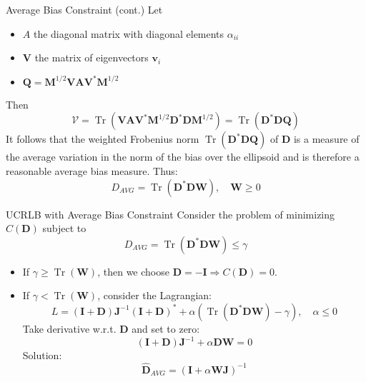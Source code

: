 \documentclass{beamer}
\begin{document}
\begin{frame}{Average Bias Constraint (cont.)}
Let
\begin{itemize}
    \item $A$ the diagonal matrix with diagonal elements $\alpha_{ii}$
    \item $\mathbf{V}$ the matrix of eigenvectors $\mathbf{v}_i$
    \item $\mathbf{Q} = \mathbf{M}^{1/2} \mathbf{V A V}^* \mathbf{M}^{1/2}$
\end{itemize}
Then 
\[
 \mathcal{V} = \operatorname{Tr}\left(\mathbf{V A V}^*\mathbf{M}^{1/2}\mathbf{D}^*\mathbf{DM}^{1/2}\right)
  = \operatorname{Tr}(\mathbf{D}^*\mathbf{D Q})
\]
It follows that the weighted Frobenius norm $\operatorname{Tr}(\mathbf{D}^*\mathbf{D Q})$ of $\mathbf{D}$ 
is a measure of the average variation in the norm of the bias over the ellipsoid and is therefore a reasonable
average bias measure. Thus:
\[
D_{AVG} = \operatorname{Tr}(\mathbf{D}^*\mathbf{D W}), \quad \mathbf{W} \geq 0
\]
\end{frame}

\begin{frame}{UCRLB with Average Bias Constraint}
    Consider the problem of minimizing $C(\mathbf{D})$ subject to
    \[
    D_{AVG} = \operatorname{Tr}(\mathbf{D}^*\mathbf{D W}) \leq \gamma
    \]
    \begin{itemize}
        \item If $\gamma \geq \operatorname{Tr}(\mathbf{W})$, then we choose 
        $\mathbf{D} = -\mathbf{I} \Rightarrow C(\mathbf{D}) = 0$.
        \item If $\gamma < \operatorname{Tr}(\mathbf{W})$, consider the Lagrangian:
        \[
        L = (\mathbf{I} + \mathbf{D}) \mathbf{J}^{-1} (\mathbf{I} + \mathbf{D})^* +
        \alpha (\operatorname{Tr}(\mathbf{D}^*\mathbf{D W}) - \gamma), \quad \alpha \leq 0
        \]
        Take derivative w.r.t. $\mathbf{D}$ and set to zero:
        \[
        (\mathbf{I} + \mathbf{D})\mathbf{J}^{-1} + \alpha\mathbf{D}\mathbf{W} = 0
        \]
        Solution:
        \[
        \hat{\mathbf{D}}_{AVG} = (\mathbf{I} + \alpha \mathbf{W J})^{-1}
        \]
    \end{itemize}
\end{frame}

\end{document}
